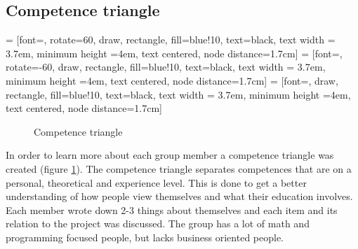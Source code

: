\subsection{Competence triangle}
 = [font=\footnotesize, rotate=60,  draw, rectangle, fill=blue!10, text=black, text width = 3.7em, minimum height =4em, text centered, node distance=1.7cm]
 =  [font=\footnotesize, rotate=-60, draw, rectangle, fill=blue!10, text=black, text width = 3.7em, minimum height =4em, text centered, node distance=1.7cm]
 = [font=\footnotesize,             draw, rectangle, fill=blue!10, text=black, text width = 3.7em, minimum height =4em, text centered, node distance=1.7cm]

\begin{figure}[!ht]
\centering
{}
\caption{Competence triangle \label{fig_triangle}}
\end{figure}

In order to learn more about each group member a competence triangle was created (figure \ref{fig_triangle}). 
The competence triangle separates competences that are on a personal, theoretical and experience level. 
This is done to get a better understanding of how people view themselves and what their education involves.
Each member wrote down 2-3 things about themselves and each item and its relation to the project was discussed.
The group has a lot of math and programming focused people, but lacks business oriented people.